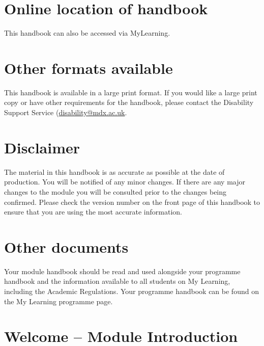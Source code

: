 \documentclass{MDXHandbook}
\begin{document}
\maketitle

\section*{Online location of handbook}
This handbook can also be accessed via MyLearning.

\section*{Other formats available}
This handbook is available in a large print format. If you would like a large print copy or have other requirements for the handbook, please contact the Disability Support Service (\href{mailto:disability@mdx.ac.uk}{disability@mdx.ac.uk}.

\section*{Disclaimer}
The material in this handbook is as accurate as possible at the date of production. You will be notified of any minor changes. If there are any major changes to the module you will be consulted prior to the changes being confirmed. Please check the version number on the front page of this handbook to ensure that you are using the most accurate information.

\section*{Other documents}
Your module handbook should be read and used alongside your programme handbook and the information available to all students on My Learning, including the Academic Regulations. Your programme handbook can be found on the My Learning programme page.

\newpage
\tableofcontents

\newpage
\section{Welcome -- Module Introduction}
\end{document}
